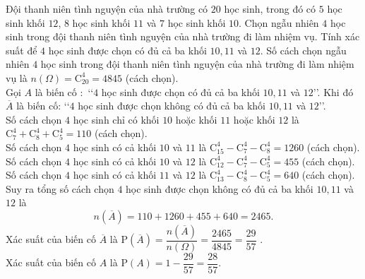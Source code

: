 \begin{vd}
	Đội thanh niên tình nguyện của nhà trường có $20$ học sinh, trong đó có $5$ học sinh khối $12$, $8$ học sinh khối $11$ và $7$ học sinh khối $10$. Chọn ngẫu nhiên $4$ học sinh trong đội thanh  niên tình nguyện của nhà trường đi làm nhiệm vụ. Tính xác suất để $4$ học sinh được chọn có đủ cả ba khối $10,11$ và $12$.
	\loigiai
	{
		Số cách chọn ngẫu nhiên $4$ học sinh trong đội thanh  niên tình nguyện của nhà trường đi làm nhiệm vụ là $n(\Omega)=\mathrm{C}_{20}^4=4845$ (cách chọn).\\
		Gọi $A$ là biến cố $\colon$ \lq\lq  $4$ học sinh được chọn có đủ cả ba khối $10,11$ và $12$\rq\rq. Khi đó $\overline{A}$ là biến cố: \lq\lq  $4$ học sinh được chọn không có đủ cả ba khối $10,11$ và $12$\rq\rq.\\
		Số cách chọn $4$ học sinh chỉ có khối $10$ hoặc khối $11$ hoặc khối $12$ là $\mathrm{C}_7^4+\mathrm{C}_8^4+\mathrm{C}_5^4=110$ (cách chọn).\\
		Số cách chọn $4$ học sinh có cả khối $10$ và $11$ là $\mathrm{C}_{15}^4 - \mathrm{C}_7^4 - \mathrm{C}_8^4=1260$ (cách chọn).\\
		Số cách chọn $4$ học sinh có cả khối $10$ và $12$ là $\mathrm{C}_{12}^4 - \mathrm{C}_7^4 - \mathrm{C}_5^4=455$ (cách chọn).\\
		Số cách chọn $4$ học sinh có cả khối $11$ và $12$ là $\mathrm{C}_{13}^4 - \mathrm{C}_8^4-\mathrm{C}_5^4=640$ (cách chọn).\\
		Suy ra tổng số cách chọn $4$ học sinh được chọn không có đủ cả ba khối $10,11$ và $12$ là
		\[n\left(\overline{A}\right)=110+1260+455+640=2465.\]
		Xác suất của biến cố $\overline{A}$ là $\mathrm{P}\left(\overline{A}\right)=\dfrac{n\left(\overline{A}\right)}{n(\Omega)}=\dfrac{2465}{4845}=\dfrac{29}{57}$ .\\
		Xác suất của biến cố $A$ là $\mathrm{P}(A)=1-\dfrac{29}{57}=\dfrac{28}{57}$.
	}
\end{vd}

